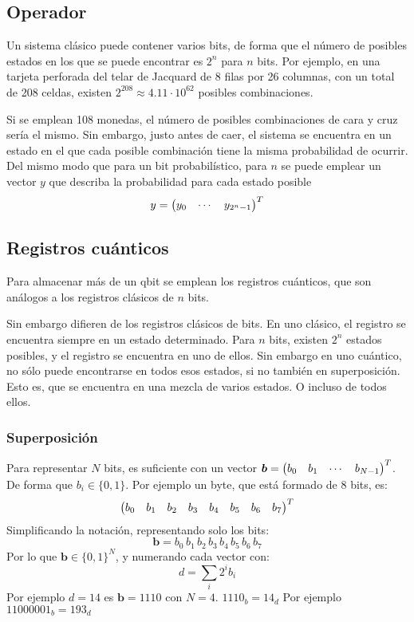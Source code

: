 \subsection{Operador}

Un sistema clásico puede contener varios bits, de forma que el número de 
posibles estados en los que se puede encontrar es $2^n$ para $n$ bits. Por 
ejemplo, en una tarjeta perforada del telar de Jacquard de $8$ filas por 26 
columnas, con un total de 208 celdas, existen $2^{208} \approx 
4.11 \cdot 10^{62}$ posibles combinaciones.

Si se emplean 108 monedas, el número de posibles combinaciones de cara y cruz 
sería el mismo. Sin embargo, justo antes de caer, el sistema se encuentra en un 
estado en el que cada posible combinación tiene la misma probabilidad de 
ocurrir. Del mismo modo que para un bit probabilístico, para $n$ se puede 
emplear un vector $y$ que describa la probabilidad para cada estado posible
$$
	y = \begin{pmatrix} y_0 & \cdots & y_{2^n-1} \end{pmatrix}^T
$$

\subsection{Registros cuánticos}
Para almacenar más de un qbit se emplean los registros cuánticos, que son 
análogos a los registros clásicos de $n$ bits.

Sin embargo difieren de los registros clásicos de bits. En uno clásico, el 
registro se encuentra siempre en un estado determinado. Para $n$ bits, existen 
$2^n$ estados posibles, y el registro se encuentra en uno de ellos. Sin embargo 
en uno cuántico, no sólo puede encontrarse en todos esos estados, si no también 
en superposición. Esto es, que se encuentra en una mezcla de varios estados. O 
incluso de todos ellos.

\subsubsection{Superposición}






Para representar $N$ bits, es suficiente con un vector $\boldsymbol{b} = 
\begin{pmatrix} b_0 & b_1 & \cdots & b_{N-1}  \end{pmatrix}^T$. De forma que $b_i \in \{0,1\}$. Por 
ejemplo un byte, que está formado de 8 bits, es:
$$\begin{pmatrix} b_0 & b_1 & b_2 & b_3 & b_4 & b_5 & b_6 & b_7 \end{pmatrix}^T$$
Simplificando la notación, representando solo los bits:
$$\boldsymbol{b} = b_0 \, b_1 \, b_2 \, b_3 \, b_4 \, b_5 \, b_6 \, b_7$$
Por lo que $\boldsymbol{b} \in \{0,1\}^N$, y numerando cada vector con:
$$d = \sum_i 2^i b_i$$
Por ejemplo $d=14$ es $\boldsymbol{b} = 1110$ con $N=4$. $1110_b = 14_d$
Por ejemplo $11000001_b = 193_d$



